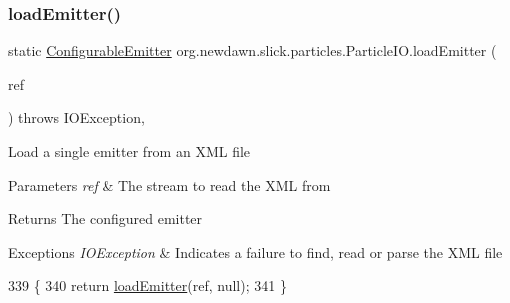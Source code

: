 \subsubsection{\texorpdfstring{load\+Emitter()}{loadEmitter()}\hspace{0.1cm}{\footnotesize\ttfamily [3/6]}}
{\footnotesize\ttfamily static \mbox{\hyperlink{classorg_1_1newdawn_1_1slick_1_1particles_1_1_configurable_emitter}{Configurable\+Emitter}} org.\+newdawn.\+slick.\+particles.\+Particle\+I\+O.\+load\+Emitter (\begin{DoxyParamCaption}\item[{Input\+Stream}]{ref }\end{DoxyParamCaption}) throws I\+O\+Exception\hspace{0.3cm}{\ttfamily [inline]}, {\ttfamily [static]}}

Load a single emitter from an X\+ML file


\begin{DoxyParams}{Parameters}
{\em ref} & The stream to read the X\+ML from \\
\hline
\end{DoxyParams}
\begin{DoxyReturn}{Returns}
The configured emitter 
\end{DoxyReturn}

\begin{DoxyExceptions}{Exceptions}
{\em I\+O\+Exception} & Indicates a failure to find, read or parse the X\+ML file \\
\hline
\end{DoxyExceptions}

\begin{DoxyCode}
339                                \{
340         \textcolor{keywordflow}{return} \mbox{\hyperlink{classorg_1_1newdawn_1_1slick_1_1particles_1_1_particle_i_o_af2afc8b074ac941f5b987b1396747a0f}{loadEmitter}}(ref, null);
341     \}
\end{DoxyCode}
\mbox{\label{classorg_1_1newdawn_1_1slick_1_1particles_1_1_particle_i_o_af2675bd2501f0927d9053be7d58b0c6e}} 
